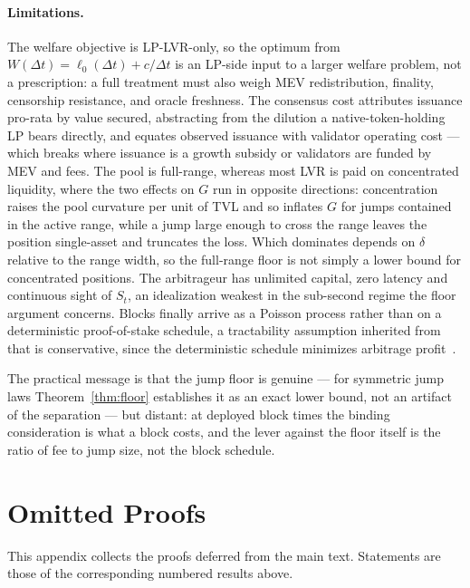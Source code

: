 \documentclass[runningheads]{llncs}
\newcommand{\dt}{\Delta t}
\newcommand{\1}{\mathbf{1}}
\newif\ifextended
\begin{document}
\paragraph{Limitations.}
The welfare objective is LP-LVR-only, so the optimum from $W(\dt) = \ell_0(\dt) + c/\dt$ is an LP-side input to a larger welfare problem, not a prescription: a full treatment must also weigh MEV redistribution, finality, censorship resistance, and oracle freshness. The consensus cost attributes issuance pro-rata by value secured, abstracting from the dilution a native-token-holding LP bears directly, and equates observed issuance with validator operating cost --- which breaks where issuance is a growth subsidy or validators are funded by MEV and fees. The pool is full-range, whereas most LVR is paid on concentrated liquidity, where the two effects on $G$ run in opposite directions: concentration raises the pool curvature per unit of TVL and so inflates $G$ for jumps contained in the active range, while a jump large enough to cross the range leaves the position single-asset and truncates the loss. Which dominates depends on $\delta$ relative to the range width, so the full-range floor is not simply a lower bound for concentrated positions. The arbitrageur has unlimited capital, zero latency and continuous sight of $S_t$, an idealization weakest in the sub-second regime the floor argument concerns. Blocks finally arrive as a Poisson process rather than on a deterministic proof-of-stake schedule, a tractability assumption inherited from~\cite{milionis2023automated} that is conservative, since the deterministic schedule minimizes arbitrage profit~\cite{nezlobin2025lvr}.

The practical message is that the jump floor is genuine --- for symmetric jump laws Theorem~\ref{thm:floor} establishes it as an exact lower bound, not an artifact of the separation --- but distant: at deployed block times the binding consideration is what a block costs, and the lever against the floor itself is the ratio of fee to jump size, not the block schedule.




\ifextended
\appendix
\section{Omitted Proofs}\label{app:proofs}

This appendix collects the proofs deferred from the main text. Statements are
those of the corresponding numbered results above.
\end{document}
